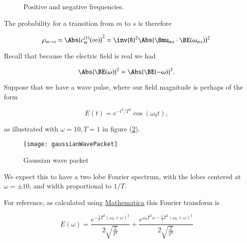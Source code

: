 \begin{figure}[htp]
   \centering
   \def\svgwidth{0.3\columnwidth}
   
   \caption{Positive and negative frequencies.}\label{fig:qmTwoL8fig0FrequenciesAbsorbtionAndEmission}
\end{figure}

The probability for a transition from $m$ to $s$ is therefore

\begin{equation}\label{eqn:qmTwoL8:70}
\rho_{m \rightarrow s} = \Abs{ c_m^{(1)}(\infty) }^2
= \inv{\hbar}^2 \Abs{\Bmu_{ms} \cdot \BE(\omega_{ms})}^2
\end{equation}

Recall that because the electric field is real we had

\begin{equation}\label{eqn:qmTwoL8:90}
\Abs{\BE(\omega)}^2 = \Abs{\BE(-\omega)}^2.
\end{equation}

Suppose that we have a wave pulse, where our field magnitude is perhaps of the form

\begin{equation}\label{eqn:qmTwoL8:110}
E(t) = e^{-t^2/T^2} \cos(\omega_0 t),
\end{equation}

as illustrated with $\omega = 10, T = 1$ in figure (\ref{fig:qmTwoL8:gaussianWavePacket}).

\begin{figure}[htp]
\centering
\texttt{[image: gaussianWavePacket]}
\caption{Gaussian wave packet}\label{fig:qmTwoL8:gaussianWavePacket}
\end{figure}

We expect this to have a two lobe Fourier spectrum, with the lobes centered at $\omega = \pm 10$, and width proportional to $1/T$.

For reference, as calculated using \href{https://github.com/peeterjoot/physicsplay/tree/master/notes/phy456/qmTwoL8figures.nb}{Mathematica} this Fourier transform is

\begin{equation}\label{eqn:qmTwoL8:130}
E(\omega) = \frac{e^{-\frac{1}{4} T^2 (\omega_0+\omega )^2}}{2 \sqrt{\frac{2}{T^2}}}+\frac{e^{\omega_0 T^2 \omega -\frac{1}{4} T^2 (\omega_0+\omega )^2}}{2 \sqrt{\frac{2}{T^2}}}
\end{equation}

